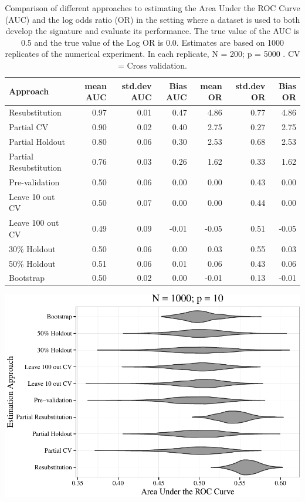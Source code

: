 \documentclass[11pt,]{article}
\begin{document}
\begin{table}

\caption{Comparison of different approaches to estimating the Area Under the ROC Curve (AUC) and the log odds ratio (OR) in the setting where a dataset is used to both develop the signature and evaluate its performance. The true value of the AUC is 0.5 and the true value of the Log OR is 0.0. Estimates are based on 1000 replicates of the numerical experiment. In each replicate,  N = 200; p = 5000 . CV = Cross validation. }
\centering
\begin{tabular}[t]{l|r|r|r|r|r|r}
\hline
Approach & mean AUC & std.dev AUC & Bias AUC & mean OR & std.dev OR & Bias OR\\
\hline
Resubstitution & 0.97 & 0.01 & 0.47 & 4.86 & 0.77 & 4.86\\
\hline
Partial CV & 0.90 & 0.02 & 0.40 & 2.75 & 0.27 & 2.75\\
\hline
Partial Holdout & 0.80 & 0.06 & 0.30 & 2.53 & 0.68 & 2.53\\
\hline
Partial Resubstitution & 0.76 & 0.03 & 0.26 & 1.62 & 0.33 & 1.62\\
\hline
Pre-validation & 0.50 & 0.06 & 0.00 & 0.00 & 0.43 & 0.00\\
\hline
Leave 10 out CV & 0.50 & 0.07 & 0.00 & 0.00 & 0.44 & 0.00\\
\hline
Leave 100 out CV & 0.49 & 0.09 & -0.01 & -0.05 & 0.51 & -0.05\\
\hline
30\% Holdout & 0.50 & 0.06 & 0.00 & 0.03 & 0.55 & 0.03\\
\hline
50\% Holdout & 0.51 & 0.06 & 0.01 & 0.06 & 0.43 & 0.06\\
\hline
Bootstrap & 0.50 & 0.02 & 0.00 & -0.01 & 0.13 & -0.01\\
\hline
\end{tabular}
\end{table}

\clearpage

\includegraphics{supplement_files/figure-latex/plotsauc-1.pdf}
\clearpage
\end{document}
